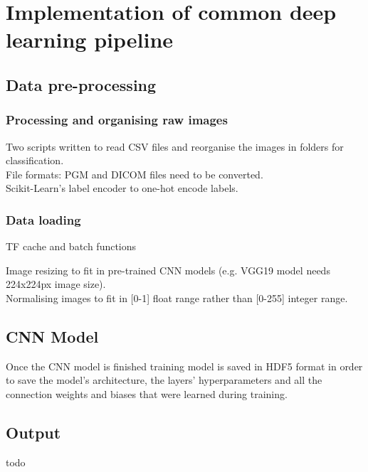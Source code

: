 \section{Implementation of common deep learning pipeline}


\subsection{Data pre-processing}

\subsubsection{Processing and organising raw images}

Two scripts written to read CSV files and reorganise the images in folders for classification.\\

File formats: PGM and DICOM files need to be converted.\\

Scikit-Learn's label encoder to one-hot encode labels.

\subsubsection{Data loading}

TF cache and batch functions

Image resizing to fit in pre-trained CNN models (e.g. VGG19 model needs 224x224px image size).\\

Normalising images to fit in [0-1] float range rather than [0-255] integer range.


\subsection{CNN Model}

Once the CNN model is finished training model is saved in HDF5 format in order to save the model's architecture, the layers' hyperparameters and all the connection weights and biases that were learned during training.


\subsection{Output}

todo

